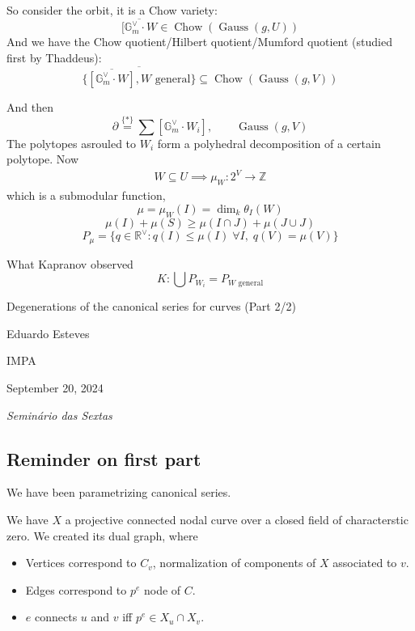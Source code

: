 So consider the orbit, it is a Chow variety:
\[\overline{[\mathbb{G}^\vee_m\cdot W}\in\operatorname{Chow}(\operatorname{Gauss}(g,U))\]
And we have the Chow quotient/Hilbert quotient/Mumford quotient (studied first by Thaddeus):
\[\overline{\{\overline{[\mathbb{G}^\vee_m\cdot W]},W\text{ general} \}} \subseteq \operatorname{Chow}(\operatorname{Gauss}(g,V))\]

And then
\[\partial\overset{\{*\}} =\sum [\mathbb{G}^\vee_m\cdot W_i],\qquad \operatorname{Gauss}(g,V)\]
The polytopes asrouled to $W_i$ form a polyhedral decomposition of a certain polytope. Now
\begin{align*}
	W\subseteq U\implies  \mu_W:2^V\longrightarrow \mathbb{Z}
\end{align*}
which is a submodular function,
\[\mu=\mu_W(I)=\dim _k\theta_I(W)\]
\[\mu(I)+\mu(S)\geq \mu(I\cap J)+\mu(J\cup J)\]
\[P_\mu=\{q\in\mathbb{R}^{\vee }:q(I)\leq \mu(I)\;\forall I,\; q(V)=\mu(V)\}\]

\begin{thing5}{What Kapranov observed}\leavevmode
	\[K:\bigcup P_{W_i}=P_{W\text{ general} } \]
\end{thing5}

\clearpage{}
{\Huge Degenerations of the canonical series for curves (Part 2/2)}

\hfill{\Large Eduardo Esteves}

{\Large \hfill  IMPA}

\hfill{\large September 20, 2024

\hfill \textit{Seminário das Sextas}}

\subsection{Reminder on first part}

We have been parametrizing canonical series.

We have $X$ a projective connected nodal curve over a closed field of characterstic zero. We created its dual graph, where
\begin{itemize}
\item Vertices correspond to $C_{v}$, normalization of components of $X$ associated to $v$.
\item Edges correspond to $p^e$ node of $C$.
\item $e$ connects $u$ and $v$ iff  $p^e\in X_u\cap X_v$.
\end{itemize}

